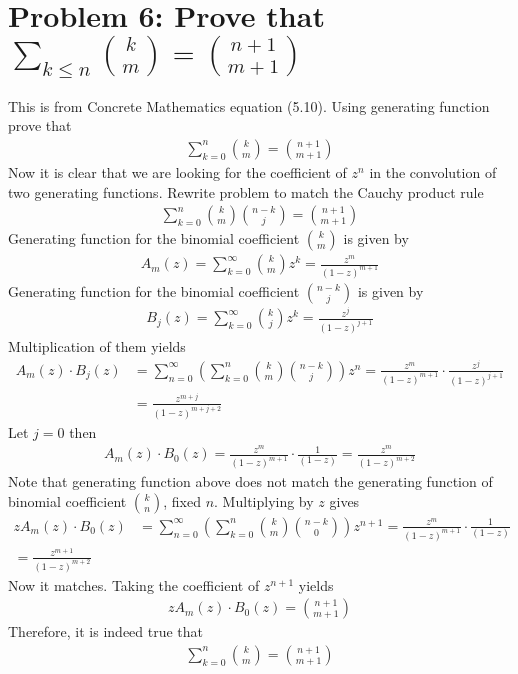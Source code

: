 ﻿\section{Problem 6: Prove that $\sum_{k \leq n} \binom{k}{m} = \binom{n+1}{m+1}$}
\label{sec:problem-6}
This is from Concrete Mathematics equation (5.10).
Using generating function prove that
\begin{align}
    \sum_{k=0}^{n} \binom{k}{m} = \binom{n+1}{m+1}
    \label{eq:identity-to-prove-problem-6}
\end{align}
Now it is clear that we are looking for the coefficient of $z^n$ in the convolution of two generating functions.
Rewrite problem to match the Cauchy product rule
\begin{align}
    \sum_{k=0}^{n} \binom{k}{m} \binom{n-k}{j} = \binom{n+1}{m+1}
    \label{eq:problem-6-general-form}
\end{align}
Generating function for the binomial coefficient $\binom{k}{m}$ is given by
\begin{align*}
    A_m(z) = \sum_{k=0}^{\infty} \binom{k}{m} z^k = \frac{z^m}{(1-z)^{m+1}}
\end{align*}
Generating function for the binomial coefficient $\binom{n-k}{j}$ is given by
\begin{align*}
    B_j(z) = \sum_{k=0}^{\infty} \binom{k}{j} z^k = \frac{z^j}{(1-z)^{j+1}}
\end{align*}
Multiplication of them yields
\begin{align*}
    A_m(z) \cdot B_j(z)
    &= \sum_{n=0}^{\infty} \left( \sum_{k=0}^{n} \binom{k}{m} \binom{n-k}{j} \right) z^n
    = \frac{z^m}{(1-z)^{m+1}} \cdot \frac{z^j}{(1-z)^{j+1}} \\
    &= \frac{z^{m+j}}{(1-z)^{m+j+2}}
\end{align*}
Let $j=0$ then
\begin{align*}
    A_m(z) \cdot B_0(z) = \frac{z^m}{(1-z)^{m+1}} \cdot \frac{1}{(1-z)} = \frac{z^m}{(1-z)^{m+2}}
\end{align*}
Note that generating function above does not match the generating function of binomial coefficient $\binom{k}{n}$,
fixed $n$.
Multiplying by $z$ gives
\begin{align*}
    z A_m(z) \cdot B_0(z)
    &= \sum_{n=0}^{\infty} \left( \sum_{k=0}^{n} \binom{k}{m} \binom{n-k}{0} \right) z^{n+1}
    = \frac{z^m}{(1-z)^{m+1}} \cdot \frac{1}{(1-z)} \\
    = \frac{z^{m+1}}{(1-z)^{m+2}}
\end{align*}
Now it matches.
Taking the coefficient of $z^{n+1}$ yields
\begin{align*}
    [z^{n+1}] z A_m(z) \cdot B_0(z) = \binom{n+1}{m+1}
\end{align*}
Therefore, it is indeed true that
\begin{align*}
    \sum_{k=0}^{n} \binom{k}{m} = \binom{n+1}{m+1}
\end{align*}
\clearpage
